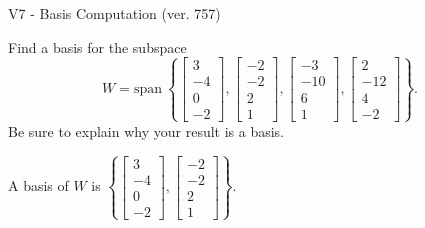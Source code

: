 \begin{exercise}
  \begin{exerciseTitle}V7 - Basis Computation (ver. 757)\end{exerciseTitle}
  \begin{exerciseStatement}
    Find a basis for the subspace 
\[W=\mathrm{span}\ \left\{\left[\begin{array}{r}
3 \\
-4 \\
0 \\
-2
\end{array}\right] , \left[\begin{array}{r}
-2 \\
-2 \\
2 \\
1
\end{array}\right] , \left[\begin{array}{r}
-3 \\
-10 \\
6 \\
1
\end{array}\right] , \left[\begin{array}{r}
2 \\
-12 \\
4 \\
-2
\end{array}\right]\right\}.\]
 Be sure to explain why your result is a basis.


  \end{exerciseStatement}
  \begin{exerciseAnswer}
   A basis of \(W\) is  \(\left\{\left[\begin{array}{r}
3 \\
-4 \\
0 \\
-2
\end{array}\right] , \left[\begin{array}{r}
-2 \\
-2 \\
2 \\
1
\end{array}\right]\right\}\).
  


  \end{exerciseAnswer}
\end{exercise}